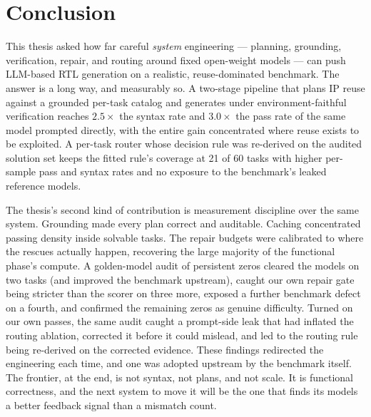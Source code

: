 \section{Conclusion}
\label{sec:conclusion}

This thesis asked how far careful \emph{system} engineering --- planning,
grounding, verification, repair, and routing around fixed open-weight
models --- can push LLM-based RTL generation on a realistic,
reuse-dominated benchmark. The answer is a long way, and measurably so.
A two-stage pipeline that plans IP reuse against a grounded per-task
catalog and generates under environment-faithful verification reaches
$2.5\times$ the syntax rate and $3.0\times$ the pass rate of the same
model prompted directly, with the entire gain concentrated where reuse
exists to be exploited. A per-task router whose decision rule was re-derived on the audited
solution set keeps the fitted rule's coverage at 21 of 60 tasks
with higher per-sample pass and syntax rates and no exposure to the
benchmark's leaked reference models.

The thesis's second kind of contribution is measurement discipline over
the same system. Grounding made every plan correct and auditable.
Caching concentrated passing density inside solvable tasks. The repair
budgets were calibrated to where the rescues actually happen, recovering
the large majority of the functional phase's compute. A golden-model
audit of persistent zeros cleared the models on two tasks (and improved
the benchmark upstream), caught our own repair gate being stricter than
the scorer on three more, exposed a further benchmark defect on a
fourth, and confirmed the remaining zeros as genuine difficulty.
Turned on our own passes, the same audit caught a
prompt-side leak that had inflated the routing ablation, corrected it
before it could mislead, and led to the routing rule being re-derived
on the corrected evidence. These findings redirected the engineering
each time, and one was adopted upstream by the benchmark itself. The
frontier, at the end, is not syntax, not plans, and not scale. It is
functional correctness, and the next system to move it will be the one
that finds its models a better feedback signal than a mismatch count.
